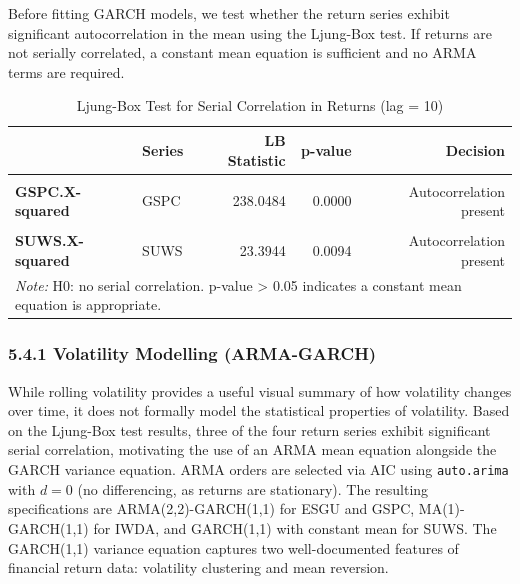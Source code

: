 \documentclass[
]{article}
\begin{document}
Before fitting GARCH models, we test whether the return series exhibit
significant autocorrelation in the mean using the Ljung-Box test. If
returns are not serially correlated, a constant mean equation is
sufficient and no ARMA terms are required.

\begingroup\fontsize{10}{12}\selectfont

\begin{longtable}[t]{>{}llrrr}
\caption{\label{tab:ljung-box}Ljung-Box Test for Serial Correlation in Returns (lag = 10)}\\
\toprule
 & Series & LB Statistic & p-value & Decision\\
\midrule
\textbf{\cellcolor{gray!10}{ESGU.X-squared}} & \cellcolor{gray!10}{ESGU} & \cellcolor{gray!10}{206.2458} & \cellcolor{gray!10}{0.0000} & \cellcolor{gray!10}{Autocorrelation present}\\
\textbf{GSPC.X-squared} & GSPC & 238.0484 & 0.0000 & Autocorrelation present\\
\textbf{\cellcolor{gray!10}{IWDA.X-squared}} & \cellcolor{gray!10}{IWDA} & \cellcolor{gray!10}{40.6412} & \cellcolor{gray!10}{0.0000} & \cellcolor{gray!10}{Autocorrelation present}\\
\textbf{SUWS.X-squared} & SUWS & 23.3944 & 0.0094 & Autocorrelation present\\
\bottomrule
\multicolumn{5}{l}{\rule{0pt}{1em}\textit{Note: } H0: no serial correlation. p-value > 0.05 indicates a constant mean equation is appropriate.}\\
\end{longtable}
\endgroup{}

\subsubsection{5.4.1 Volatility Modelling
(ARMA-GARCH)}\label{volatility-modelling-arma-garch}

While rolling volatility provides a useful visual summary of how
volatility changes over time, it does not formally model the statistical
properties of volatility. Based on the Ljung-Box test results, three of
the four return series exhibit significant serial correlation,
motivating the use of an ARMA mean equation alongside the GARCH variance
equation. ARMA orders are selected via AIC using \texttt{auto.arima}
with \(d = 0\) (no differencing, as returns are stationary). The
resulting specifications are ARMA(2,2)-GARCH(1,1) for ESGU and GSPC,
MA(1)-GARCH(1,1) for IWDA, and GARCH(1,1) with constant mean for SUWS.
The GARCH(1,1) variance equation captures two well-documented features
of financial return data: volatility clustering and mean reversion.
\end{document}

